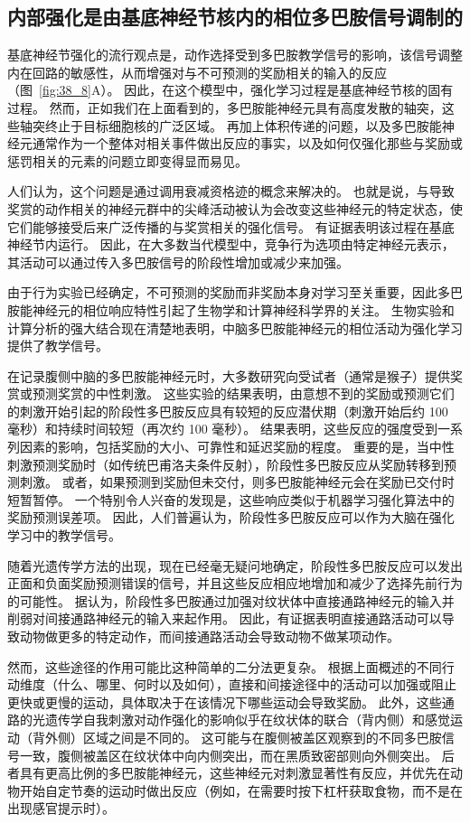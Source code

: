 \subsection{内部强化是由基底神经节核内的相位多巴胺信号调制的}

基底神经节强化的流行观点是，动作选择受到多巴胺教学信号的影响，该信号调整内在回路的敏感性，从而增强对与不可预测的奖励相关的输入的反应（图~\ref{fig:38_8}A）。
因此，在这个模型中，强化学习过程是基底神经节核的固有过程。
然而，正如我们在上面看到的，多巴胺能神经元具有高度发散的轴突，这些轴突终止于目标细胞核的广泛区域。
再加上体积传递的问题，以及多巴胺能神经元通常作为一个整体对相关事件做出反应的事实，以及如何仅强化那些与奖励或惩罚相关的元素的问题立即变得显而易见。


人们认为，这个问题是通过调用衰减资格迹的概念来解决的。
也就是说，与导致奖赏的动作相关的神经元群中的尖峰活动被认为会改变这些神经元的特定状态，使它们能够接受后来广泛传播的与奖赏相关的强化信号。
有证据表明该过程在基底神经节内运行。
因此，在大多数当代模型中，竞争行为选项由特定神经元表示，其活动可以通过传入多巴胺信号的阶段性增加或减少来加强。


由于行为实验已经确定，不可预测的奖励而非奖励本身对学习至关重要，因此多巴胺能神经元的相位响应特性引起了生物学和计算神经科学界的关注。
生物实验和计算分析的强大结合现在清楚地表明，中脑多巴胺能神经元的相位活动为强化学习提供了教学信号。


在记录腹侧中脑的多巴胺能神经元时，大多数研究向受试者（通常是猴子）提供奖赏或预测奖赏的中性刺激。
这些实验的结果表明，由意想不到的奖励或预测它们的刺激开始引起的阶段性多巴胺反应具有较短的反应潜伏期（刺激开始后约 100 毫秒）和持续时间较短（再次约 100 毫秒）。
结果表明，这些反应的强度受到一系列因素的影响，包括奖励的大小、可靠性和延迟奖励的程度。
重要的是，当中性刺激预测奖励时（如传统巴甫洛夫条件反射），阶段性多巴胺反应从奖励转移到预测刺激。 或者，如果预测到奖励但未交付，则多巴胺能神经元会在奖励已交付时短暂暂停。
一个特别令人兴奋的发现是，这些响应类似于机器学习强化算法中的奖励预测误差项。
因此，人们普遍认为，阶段性多巴胺反应可以作为大脑在强化学习中的教学信号。


随着光遗传学方法的出现，现在已经毫无疑问地确定，阶段性多巴胺反应可以发出正面和负面奖励预测错误的信号，并且这些反应相应地增加和减少了选择先前行为的可能性。
据认为，阶段性多巴胺通过加强对纹状体中直接通路神经元的输入并削弱对间接通路神经元的输入来起作用。
因此，有证据表明直接通路活动可以导致动物做更多的特定动作，而间接通路活动会导致动物不做某项动作。


然而，这些途径的作用可能比这种简单的二分法更复杂。
根据上面概述的不同行动维度（什么、哪里、何时以及如何），直接和间接途径中的活动可以加强或阻止更快或更慢的运动，具体取决于在该情况下哪些运动会导致奖励。
此外，这些通路的光遗传学自我刺激对动作强化的影响似乎在纹状体的联合（背内侧）和感觉运动（背外侧）区域之间是不同的。
这可能与在腹侧被盖区观察到的不同多巴胺信号一致，腹侧被盖区在纹状体中向内侧突出，而在黑质致密部则向外侧突出。
后者具有更高比例的多巴胺能神经元，这些神经元对刺激显著性有反应，并优先在动物开始自定节奏的运动时做出反应（例如，在需要时按下杠杆获取食物，而不是在出现感官提示时）。


